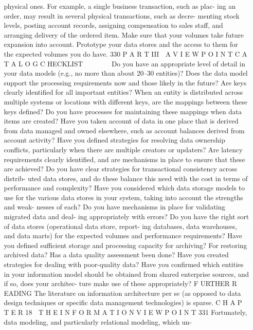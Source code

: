 physical ones. For example, a single business transaction, such as plac-
ing an order, may result in several physical transactions, such as decre-
menting stock levels, posting account records, assigning compensation to
sales staff, and arranging delivery of the ordered item.
Make sure that your volumes take future expansion into account.
Prototype your data stores and the access to them for the expected
volumes you do have.
330
 P A R T III  A V I E W P O I N T C A T A L O G
C HECKLIST
Do you have an appropriate level of detail in your data models (e.g., no
more than about 20–30 entities)?
Does the data model support the processing requirements now and those
likely in the future?
Are keys clearly identified for all important entities?
When an entity is distributed across multiple systems or locations with
different keys, are the mappings between these keys defined? Do you have
processes for maintaining these mappings when data items are created?
Have you taken account of data in one place that is derived from data
managed and owned elsewhere, such as account balances derived from
account activity?
Have you defined strategies for resolving data ownership conflicts,
particularly when there are multiple creators or updaters?
Are latency requirements clearly identified, and are mechanisms in place
to ensure that these are achieved?
Do you have clear strategies for transactional consistency across distrib-
uted data stores, and do these balance this need with the cost in terms of
performance and complexity?
Have you considered which data storage models to use for the various
data stores in your system, taking into account the strengths and weak-
nesses of each?
Do you have mechanisms in place for validating migrated data and deal-
ing appropriately with errors?
Do you have the right sort of data stores (operational data store, report-
ing databases, data warehouses, and data marts) for the expected
volumes and performance requirements?
Have you defined sufficient storage and processing capacity for
archiving? For restoring archived data?
Has a data quality assessment been done? Have you created strategies
for dealing with poor-quality data?
Have you confirmed which entities in your information model should be
obtained from shared enterprise sources, and if so, does your architec-
ture make use of these appropriately?
F URTHER R EADING
The literature on information architecture per se (as opposed to data design
techniques or specific data management technologies) is sparse.
C H A P T E R 18  T H E I N F O R M A T I O N V I E W P O I N T
 331
Fortunately, data modeling, and particularly relational modeling, which un-
